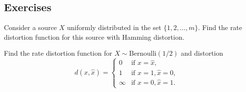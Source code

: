 \documentclass[a4paper, 11pt, openany]{book}
\begin{document}
\subsection{Exercises}


\begin{exercise}
Consider a source $X$ uniformly distributed in the set $\{1,2,\dots,m\}$. Find the rate distortion function for this source with Hamming distortion.
\end{exercise}





\begin{exercise}
Find the rate distortion function for $X \sim \text{Bernoulli}(1/2)$ and distortion
\[
	d(x, \hat{x}) = \begin{cases}
	0 &\text{if } x = \hat{x},\\
	1 &\text{if } x=1, \hat{x} = 0,\\
	\infty &\text{if } x=0, \hat{x} = 1.
	\end{cases}
\]
\end{exercise}
\end{document}
